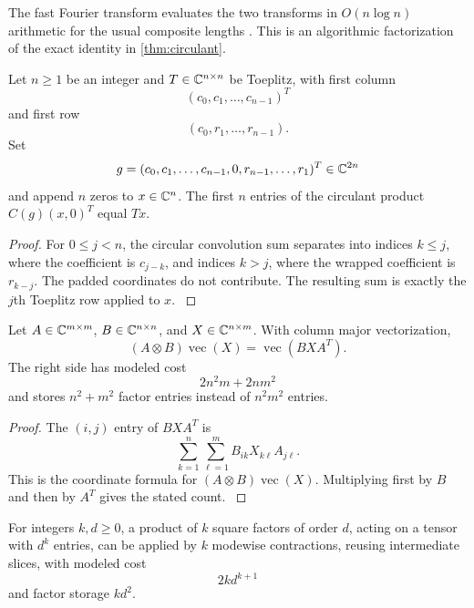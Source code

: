 The fast Fourier transform evaluates the two transforms in \(O(n\log n)\) arithmetic for the usual composite lengths \cite{CooleyTukey1965}. This is an algorithmic factorization of the exact identity in \cref{thm:circulant}.

\begin{corollary}\label{main:corollary:004}\label{cor:toeplitz_embedding}
Let $n\ge1$ be an integer and $T\in\CC^{n\times n}$ be Toeplitz, with first column
\[
(c_0,c_1,\ldots,c_{n-1})^T
\]
and first row
\[
(c_0,r_1,\ldots,r_{n-1}).
\]
Set
\[
g
=
(c_0,c_1,\ldots,c_{n-1},0,r_{n-1},\ldots,r_1)^T
\in\CC^{2n}
\]
and append \(n\) zeros to \(x\in\CC^n\). The first \(n\) entries of the circulant product \(C(g)(x,0)^T\) equal \(Tx\).
\end{corollary}

\begin{proof}\label{main:proof:015}
For \(0\leq j<n\), the circular convolution sum separates into indices \(k\leq j\), where the coefficient is \(c_{j-k}\), and indices \(k>j\), where the wrapped coefficient is \(r_{k-j}\). The padded coordinates do not contribute. The resulting sum is exactly the \(j\)th Toeplitz row applied to \(x\).
\label{main:proof:015:end}\end{proof}

\begin{theorem}\label{main:theorem:007}\label{thm:kronecker_apply}
Let \(A\in\CC^{m\times m}\), \(B\in\CC^{n\times n}\), and \(X\in\CC^{n\times m}\). With column major vectorization,
\[
\boxed{
(A\otimes B)\operatorname{vec}(X)
=
\operatorname{vec}(BXA^T).
}
\]
The right side has modeled cost
\[
\boxed{
2n^2m+2nm^2
}
\]
and stores \(n^2+m^2\) factor entries instead of \(n^2m^2\) entries.
\end{theorem}

\begin{proof}\label{main:proof:016}
The \((i,j)\) entry of \(BXA^T\) is
\[
\sum_{k=1}^{n}\sum_{\ell=1}^{m}
B_{ik}X_{k\ell}A_{j\ell}.
\]
This is the coordinate formula for \((A\otimes B)\operatorname{vec}(X)\). Multiplying first by \(B\) and then by \(A^T\) gives the stated count.
\label{main:proof:016:end}\end{proof}

\begin{corollary}\label{main:corollary:005}\label{cor:tensor_modewise}
For integers $k,d\ge0$, a product of $k$ square factors of order $d$, acting on a tensor with $d^k$ entries, can be applied by $k$ modewise contractions, reusing intermediate slices, with modeled cost
\[
\boxed{
2k d^{k+1}
}
\]
and factor storage \(kd^2\).
\end{corollary}

